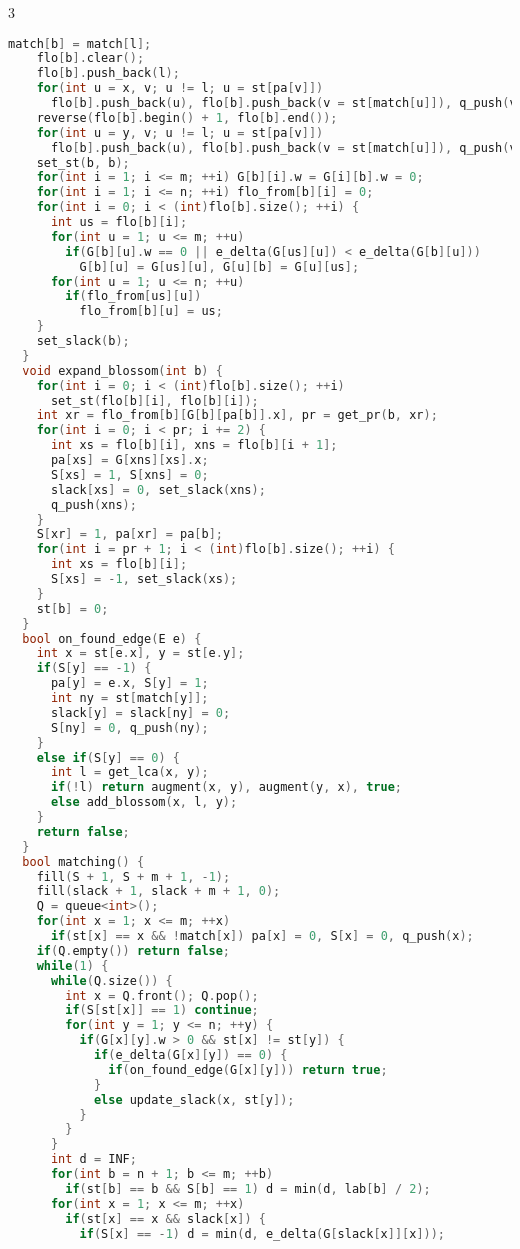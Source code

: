 \documentclass[9pt,a4paper,landscape,twosided]{extarticle}
\begin{document}
\begin{multicols*}{3}
\begin{lstlisting}[language=C++]
    match[b] = match[l];
    flo[b].clear();
    flo[b].push_back(l);
    for(int u = x, v; u != l; u = st[pa[v]])
      flo[b].push_back(u), flo[b].push_back(v = st[match[u]]), q_push(v);
    reverse(flo[b].begin() + 1, flo[b].end());
    for(int u = y, v; u != l; u = st[pa[v]])
      flo[b].push_back(u), flo[b].push_back(v = st[match[u]]), q_push(v);
    set_st(b, b);
    for(int i = 1; i <= m; ++i) G[b][i].w = G[i][b].w = 0;
    for(int i = 1; i <= n; ++i) flo_from[b][i] = 0;
    for(int i = 0; i < (int)flo[b].size(); ++i) {
      int us = flo[b][i];
      for(int u = 1; u <= m; ++u)
        if(G[b][u].w == 0 || e_delta(G[us][u]) < e_delta(G[b][u]))
          G[b][u] = G[us][u], G[u][b] = G[u][us];
      for(int u = 1; u <= n; ++u)
        if(flo_from[us][u])
          flo_from[b][u] = us;
    }
    set_slack(b);
  }
  void expand_blossom(int b) {
    for(int i = 0; i < (int)flo[b].size(); ++i)
      set_st(flo[b][i], flo[b][i]);
    int xr = flo_from[b][G[b][pa[b]].x], pr = get_pr(b, xr);
    for(int i = 0; i < pr; i += 2) {
      int xs = flo[b][i], xns = flo[b][i + 1];
      pa[xs] = G[xns][xs].x;
      S[xs] = 1, S[xns] = 0;
      slack[xs] = 0, set_slack(xns);
      q_push(xns);
    }
    S[xr] = 1, pa[xr] = pa[b];
    for(int i = pr + 1; i < (int)flo[b].size(); ++i) {
      int xs = flo[b][i];
      S[xs] = -1, set_slack(xs);
    }
    st[b] = 0;
  }
  bool on_found_edge(E e) {
    int x = st[e.x], y = st[e.y];
    if(S[y] == -1) {
      pa[y] = e.x, S[y] = 1;
      int ny = st[match[y]];
      slack[y] = slack[ny] = 0;
      S[ny] = 0, q_push(ny);
    }
    else if(S[y] == 0) {
      int l = get_lca(x, y);
      if(!l) return augment(x, y), augment(y, x), true;
      else add_blossom(x, l, y);
    }
    return false;
  }
  bool matching() {
    fill(S + 1, S + m + 1, -1);
    fill(slack + 1, slack + m + 1, 0);
    Q = queue<int>();
    for(int x = 1; x <= m; ++x)
      if(st[x] == x && !match[x]) pa[x] = 0, S[x] = 0, q_push(x);
    if(Q.empty()) return false;
    while(1) {
      while(Q.size()) {
        int x = Q.front(); Q.pop();
        if(S[st[x]] == 1) continue;
        for(int y = 1; y <= n; ++y) {
          if(G[x][y].w > 0 && st[x] != st[y]) {
            if(e_delta(G[x][y]) == 0) {
              if(on_found_edge(G[x][y])) return true;
            }
            else update_slack(x, st[y]);
          }
        }
      }
      int d = INF;
      for(int b = n + 1; b <= m; ++b)
        if(st[b] == b && S[b] == 1) d = min(d, lab[b] / 2);
      for(int x = 1; x <= m; ++x)
        if(st[x] == x && slack[x]) {
          if(S[x] == -1) d = min(d, e_delta(G[slack[x]][x]));

\end{lstlisting}
\end{multicols*}
\end{document}
